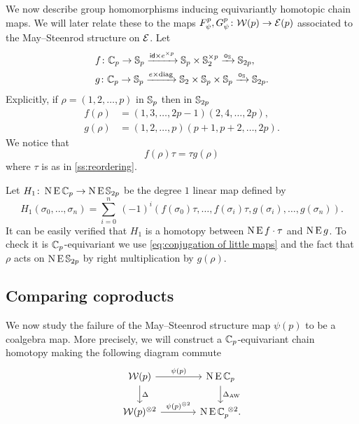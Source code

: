We now describe group homomorphisms inducing equivariantly homotopic chain maps.
We will later relate these to the maps $F_\psi^p, G_\psi^p \colon \mathcal{W}(p) \to \mathcal{E}(p)$ associated to the May--Steenrod structure on $\mathcal{E}$.
Let
\[
\begin{split}
	&f \colon \mathbb{C}_p \to \mathbb{S}_p \xrightarrow{\mathsf{id} \times e^{\times p}} \mathbb{S}_p \times \mathbb{S}_2^{\times p} \xrightarrow{\bm{\circ}_{\mathbb{S}}} \mathbb{S}_{2p}, \\
	&g \colon \mathbb{C}_p \to \mathbb{S}_p \xrightarrow{e \times \mathrm{diag}} \mathbb{S}_2 \times \mathbb{S}_p \times \mathbb{S}_p \xrightarrow{\bm{\circ}_{\mathbb{S}}} \mathbb{S}_{2p}.
\end{split}
\]
Explicitly, if $\rho = (1,2,\dots,p)$ in $\mathbb{S}_p$ then in $\mathbb{S}_{2p}$
\begin{align}
	\label{eq:explicitl little f}
	f(\rho) &= (1,3,\dots,2p-1)(2,4,\dots,2p), \\
	\label{eq:explicitl little g}
	g(\rho) &= (1,2,\dots,p)(p+1,p+2,\dots,2p).
\end{align}
We notice that
\begin{equation}\label{eq:conjugation of little maps}
	f(\rho) \tau = \tau g(\rho)
\end{equation}
where $\tau$ is as in \cref{ss:reordering}.

Let $H_1 \colon \operatorname{N}\operatorname{E}\mathbb{C}_p \to \operatorname{N}\operatorname{E}\mathbb{S}_{2p}$ be the degree $1$ linear map defined by
\[
H_1(\sigma_0,\dots,\sigma_n) =
\sum_{i=0}^n \ (-1)^i (f(\sigma_0) \tau, \dots, f(\sigma_i) \tau, g(\sigma_i), \dots, g(\sigma_n)).
\]
It can be easily verified that $H_1$ is a homotopy between $\operatorname{N} \operatorname{E} f \cdot \tau$ and $\operatorname{N} \operatorname{E} g$.
To check it is $\mathbb{C}_p$-equivariant we use \cref{eq:conjugation of little maps} and the fact that $\rho$ acts on $\operatorname{N}\operatorname{E}\mathbb{S}_{2p}$ by right multiplication by $g(\rho)$.

\subsection{Comparing coproducts}

We now study the failure of the May--Steenrod structure map $\psi(p)$ to be a coalgebra map.
More precisely, we will construct a $\mathbb{C}_p$-equivariant chain homotopy making the following diagram commute
\[
\begin{tikzcd}[column sep=large]
	\cW(p) \arrow[r,"\psi(p)"] \arrow[d,"\Delta"] & \chains\EE\cyc_p \arrow[d,"\Delta_{\AW}"]\\
	\cW(p)^{\ot 2} \arrow[r,"\psi(p)^{\ot 2}"] & \chains\EE\cyc_p^{\ \ot 2}.
\end{tikzcd}
\]
\TBW{}

